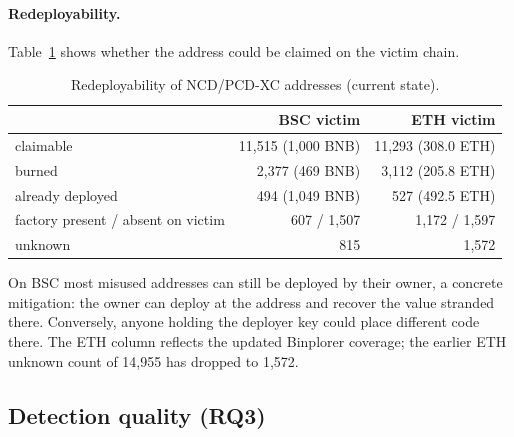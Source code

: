 \documentclass[runningheads]{llncs}
\begin{document}
\paragraph{Redeployability.} Table~\ref{tab:redeploy} shows whether the address
could be claimed on the victim chain.
\begin{table}[t]
\caption{Redeployability of NCD/PCD-XC addresses (current state).}
\label{tab:redeploy}
\centering
\begin{tabular}{@{}lrr@{}}
\toprule
 & BSC victim & ETH victim\\
\midrule
claimable & 11{,}515 (1{,}000 BNB) & 11{,}293 (308.0 ETH)\\
burned & 2{,}377 (469 BNB) & 3{,}112 (205.8 ETH)\\
already deployed & 494 (1{,}049 BNB) & 527 (492.5 ETH)\\
factory present / absent on victim & 607 / 1{,}507 & 1{,}172 / 1{,}597\\
unknown & 815 & 1{,}572\\
\bottomrule
\end{tabular}
\end{table}
On BSC most misused addresses can still be deployed by their owner, a concrete
mitigation: the owner can deploy at the address and recover the value
stranded there. Conversely, anyone holding the deployer key could place
different code there. The ETH column reflects the updated Binplorer coverage; the
earlier ETH unknown count of 14{,}955 has dropped to 1{,}572.

\subsection{Detection quality (RQ3)}
\end{document}
